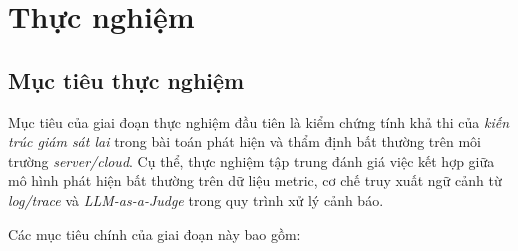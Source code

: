 \section{Thực nghiệm}
\subsection{Mục tiêu thực nghiệm}
Mục tiêu của giai đoạn thực nghiệm đầu tiên là kiểm chứng tính khả thi của \textit{kiến trúc giám sát lai} trong bài toán phát hiện và thẩm định bất thường trên môi trường \textit{server/cloud}. Cụ thể, thực nghiệm tập trung đánh giá việc kết hợp giữa mô hình phát hiện bất thường trên dữ liệu metric, cơ chế truy xuất ngữ cảnh từ \textit{log/trace} và \textit{LLM-as-a-Judge} trong quy trình xử lý cảnh báo.

Các mục tiêu chính của giai đoạn này bao gồm:
